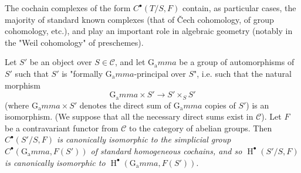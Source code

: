 \begin{remark}\label{fga3.i-a.4.c-remark}
    The cochain complexes of the form $C^\bullet(T/S,F)$ contain, as particular cases, the majority of standard known complexes (that of Čech cohomology, of group cohomology, etc.), and play an important role in algebraic geometry (notably in the "Weil cohomology" of preschemes).
\end{remark}

\label{fga3.i-a.4.d}
\begin{example}\label{fga3.i-a.4-example-1}
    Let $S'$ be an object over $S\in\mathcal{C}$, and let $\operatorname{G_a}mma$ be a group of automorphisms of $S'$ such that $S'$ is "formally $\operatorname{G_a}mma$-principal over $S$", i.e. such that the natural morphism
    \[
        \operatorname{G_a}mma\times S' \to S'\times_S S'
    \]
    (where $\operatorname{G_a}mma\times S'$ denotes the direct sum of $\operatorname{G_a}mma$ copies of $S'$) is an isomorphism.
    (We suppose that all the necessary direct sums exist in $\mathcal{C}$).
    Let $F$ be a contravariant functor from $\mathcal{C}$ to the category of abelian groups.
    Then \emph{$C^\bullet(S'/S,F)$ is canonically isomorphic to the simplicial group $C^\bullet(\operatorname{G_a}mma,F(S'))$ of standard homogeneous cochains, and so $\operatorname{H}^\bullet(S'/S,F)$ is canonically isomorphic to $\operatorname{H}^\bullet(\operatorname{G_a}mma,F(S'))$}.
\end{example}

